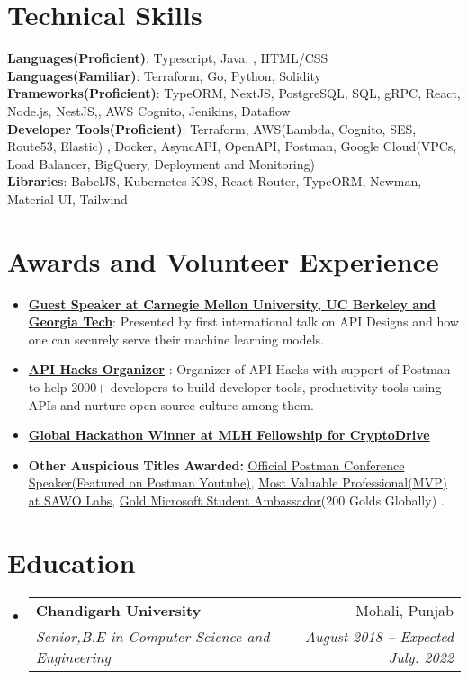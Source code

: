 \documentclass[letterpaper,11pt]{article}
\makeatletter
\newcommand{\resumeItem}[1]{
  \item\small{
    {#1 \vspace{-2pt}}
  }
}
\newcommand{\resumeSubheading}[4]{
  \vspace{-2pt}\item
    \begin{tabular*}{0.97\textwidth}[t]{l@{\extracolsep{\fill}}r}
      \textbf{#1} & #2 \\
      \textit{\small#3} & \textit{\small #4} \\
    \end{tabular*}\vspace{-7pt}
}
\newcommand{\resumeSubHeadingListStart}{\begin{itemize}[leftmargin=0.15in, label={}]}
\newcommand{\resumeSubHeadingListEnd}{\end{itemize}}
\newcommand{\resumeItemListStart}{\begin{itemize}}
\newcommand{\resumeItemListEnd}{\end{itemize}\vspace{-5pt}}
\makeatother
\begin{document}
%
\section{Technical Skills}
 \begin{itemize}[leftmargin=0.15in, label={}]
    \small{\item{
     \textbf{Languages(Proficient)}{: Typescript, Java, , HTML/CSS} \\
      \textbf{Languages(Familiar)}{: Terraform, Go, Python, Solidity } \\
     \textbf{Frameworks(Proficient)}{: TypeORM, NextJS, PostgreSQL, SQL, gRPC, React, Node.js, NestJS,, AWS Cognito, Jenikins, Dataflow  } \\
     \textbf{Developer Tools(Proficient)}{: Terraform, AWS(Lambda, Cognito, SES, Route53, Elastic) , Docker, AsyncAPI, OpenAPI, Postman, Google Cloud(VPCs, Load Balancer, BigQuery, Deployment and Monitoring) } \\
     \textbf{Libraries}{: BabelJS, Kubernetes K9S, React-Router, TypeORM, Newman, Material UI, Tailwind  }
    }}
 \end{itemize}

\section{Awards and Volunteer Experience }
 \begin{itemize}[leftmargin=0.15in, label={}]
    \small{\item{
        \resumeItemListStart
                \resumeItem{\textbf{\href{https://dsailtconference.org/schedule/}{Guest Speaker at Carnegie Mellon University, UC Berkeley and Georgia Tech}}: Presented by first international talk on API Designs and how one can securely serve their machine learning models.}
                \resumeItem{\textbf{\href{https://apihacks.co}{API Hacks Organizer} }: Organizer of API Hacks with support of Postman to help 2000+ developers to build developer tools, productivity tools using APIs and nurture open source culture among them.}
                \resumeItem{\textbf{\href{https://devpost.com/software/cryptodrive}{Global Hackathon Winner at MLH Fellowship for CryptoDrive}}}
                \resumeItem{\textbf{Other Auspicious Titles Awarded:} \href{https://www.youtube.com/watch?v=-P_IGKuYmeY}{Official Postman Conference Speaker(Featured on Postman Youtube)},  \href{https://twitter.com/SawoLabs/status/1418869910332055552}{Most Valuable Professional(MVP) at SAWO Labs}, \href{https://studentambassadors.microsoft.com/en-US/profile/49532}{Gold Microsoft Student Ambassador}(200 Golds Globally) .}
      \resumeItemListEnd
    }}
 \end{itemize}
 
\section{Education}
  \resumeSubHeadingListStart
    \resumeSubheading
      {Chandigarh University}{Mohali, Punjab}
      {Senior,B.E in Computer Science and Engineering}{August 2018 -- Expected July. 2022}
  \resumeSubHeadingListEnd
\end{document}
